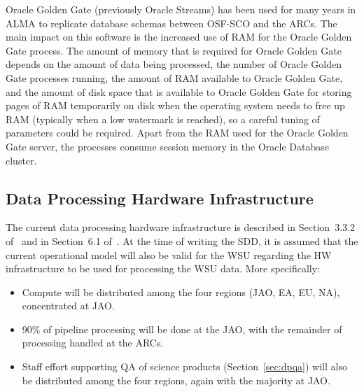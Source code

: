 
Oracle Golden Gate (previously Oracle Streams) has been used for many years in ALMA to replicate database schemas between OSF-SCO and the ARCs. The main impact on this software is the increased use of RAM for the Oracle Golden Gate process. The amount of memory that is required for Oracle Golden Gate depends on the amount of data being processed, the number of Oracle Golden Gate processes running, the amount of RAM available to Oracle Golden Gate, and the amount of disk space that is available to Oracle Golden Gate for storing pages of RAM temporarily on disk when the operating system needs to free up RAM (typically when a low watermark is reached), so a careful tuning of parameters could be required. Apart from the RAM used for the Oracle Golden Gate server, the processes consume session memory in the Oracle Database cluster.


\subsection{Data Processing Hardware Infrastructure} %
\label{par:processing_cluster}

The current data processing hardware infrastructure is described in Section~3.3.2 of~\cite{dp} and in Section~6.1 of~\cite{dpda}. At the time of writing the SDD, it is assumed that the current operational model will also be valid for the WSU regarding the HW infrastructure to be used for processing the WSU data. More specifically:
\begin{itemize}[itemsep=-0.5em]
    \item Compute will be distributed among the four regions (JAO, EA, EU, NA), concentrated at JAO.
    \item 90\% of pipeline processing will be done at the JAO, with the remainder of processing handled at the ARCs. 
    \item Staff effort supporting \ac{QA} of science products (Section~\ref{sec:dpqa}) will also be distributed among the four regions, again with the majority  at JAO.
\end{itemize}



